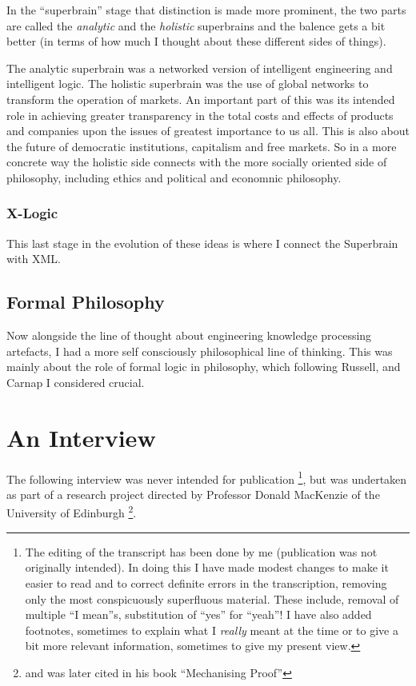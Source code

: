 \documentclass[10pt,titlepage]{book}
\begin{document}
In the ``superbrain'' stage that distinction is made more prominent, the two parts are called the {\it analytic} and the {\it holistic} superbrains and the balence gets a bit better (in terms of how much I thought about these different sides of things).

The analytic superbrain was a networked version of intelligent engineering and intelligent logic.
The holistic superbrain was the use of global networks to transform the operation of markets.
An important part of this was its intended role in achieving greater transparency in the total costs and effects of products and companies upon the issues of greatest importance to us all.
This is also about the future of democratic institutions, capitalism and free markets.
So in a more concrete way the holistic side connects with the more socially oriented side of philosophy, including ethics and political and economnic philosophy.

\subsection{X-Logic}

This last stage in the evolution of these ideas is where I connect the Superbrain with XML.

\section{Formal Philosophy}

Now alongside the line of thought about engineering knowledge processing artefacts, I had a more self consciously philosophical line of thinking.
This was mainly about the role of formal logic in philosophy, which following Russell, and Carnap I considered crucial.

\appendix

\chapter{An Interview}

The following interview was never intended for publication%
\footnote{
The editing of the transcript has been done by me (publication was not originally intended).
In doing this I have made modest changes to make it easier to read and to correct definite errors in the transcription, removing only the most conspicuously superfluous material.
These include, removal of multiple ``I mean''s, substitution of ``yes'' for ``yeah''!
I have also added footnotes, sometimes to explain what I {\it really} meant at the time or to give a bit more relevant information, sometimes to give my present view.

}, but was undertaken as part of a research project directed by Professor Donald MacKenzie of the University of Edinburgh%
\footnote{
and was later cited in his book ``Mechanising Proof''\cite{mackenzie}}.
\end{document}
